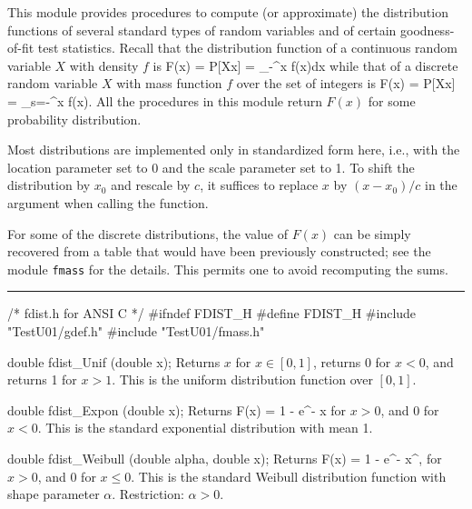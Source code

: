 
This module provides procedures to compute (or approximate)
the distribution functions of several standard types of random variables
and of certain goodness-of-fit test statistics.
Recall that the distribution function of a continuous random variable $X$ 
with density $f$ is
\eq
  F(x) = P[X\le x] = \int_{-\infty}^x f(x)dx 
\endeq
while that of a discrete random variable $X$ with mass function $f$ 
over the set of integers is
\eq
  F(x) = P[X\le x] = \sum_{s=-\infty}^x f(x).
\endeq
All the procedures in this module return $F(x)$ for some 
probability distribution.

Most distributions are implemented only in standardized form here,
i.e., with the location parameter set to 0 and the scale parameter
set to 1.  To shift the distribution by $x_0$ and rescale by $c$, 
it suffices to replace $x$ by $(x-x_0)/c$ in the argument when 
calling the function.

 For some of the discrete distributions, the value of $F(x)$ can be
 simply recovered from a table that would have been previously
 constructed; see the module {\tt fmass} for the details.
 This permits one to avoid recomputing the sums.


\bigskip\hrule\medskip
\code\hide
/* fdist.h for ANSI C */
#ifndef FDIST_H
#define FDIST_H
\endhide
#include "TestU01/gdef.h"
#include "TestU01/fmass.h"
\endcode


\code

double fdist_Unif (double x);
\endcode
  \tab
  Returns $x$ for $x \in [0, 1]$, returns 0 for $x < 0$, and returns 1
  for $x > 1$. This is the uniform distribution function over $[0, 1]$.
 \endtab
\code


double fdist_Expon (double x);
\endcode
 \tab
  Returns 
  \eq
   F(x) = 1 - e^{- x}                          
  \endeq
  for $x > 0$, and 0 for $x<0$.  This is the standard exponential 
  distribution \cite{tJOH95a} with mean 1.
 \endtab
\code


double fdist_Weibull (double alpha, double x);
\endcode
  \tab
  Returns 
  \eq
   F(x) = 1 - e^{- x^\alpha},                 
  \endeq
  for $x>0$, and 0 for $x\le 0$.
  This is the standard Weibull distribution function \cite{tJOH95a} with shape 
  parameter $\alpha$.
  Restriction: $\alpha > 0$.
 \endtab
\code


